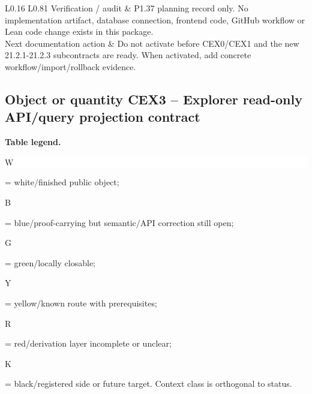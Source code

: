 \begin{longtable}{L{0.16\linewidth} L{0.81\linewidth}}
\hline\addlinespace[0.20em]
Verification /\allowbreak{} audit & P1.37 planning record only. No implementation artifact, database connection, frontend code, GitHub workflow or Lean code change exists in this package.\\
\hline\addlinespace[0.20em]
Next documentation action & Do not activate before CEX0/\allowbreak{}CEX1 and the new 21.2.1-21.2.3 subcontracts are ready. When activated, add concrete workflow/\allowbreak{}import/\allowbreak{}rollback evidence.\\
\hline\addlinespace[0.20em]
\end{longtable}
\subsection*{Object or quantity CEX3 -- Explorer read-only API/\allowbreak{}query projection contract}
\hypertarget{objproof:CEX3}{}
\par\smallskip\noindent\begin{minipage}{0.99\linewidth}\footnotesize\raggedright\textbf{Table legend.} \colorbox{white}{\strut W} = white/finished public object; \colorbox{cyan!20}{\strut B} = blue/proof-carrying but semantic/API correction still open; \colorbox{green!18}{\strut G} = green/locally closable; \colorbox{yellow!25}{\strut Y} = yellow/known route with prerequisites; \colorbox{red!20}{\strut R} = red/derivation layer incomplete or unclear; \colorbox{black!18}{\strut K} = black/registered side or future target. Context class is orthogonal to status.\end{minipage}\par\vspace{0.25em}
